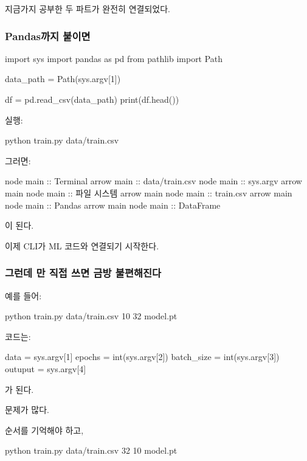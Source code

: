 지금가지 공부한 두 파트가 완전히 연결되었다.

\subsubsection{Pandas까지 붙이면}

\begin{dhkcode}
import sys
import pandas as pd
from pathlib import Path

data_path = Path(sys.argv[1])

df = pd.read_csv(data_path)
print(df.head())
\end{dhkcode}

실행:

\begin{dhkzsh}
python train.py data/train.csv
\end{dhkzsh}

그러면:

\begin{dhkbranch}[in=8]
node main :: Terminal
arrow main :: data/train.csv
node main :: sys.argv
arrow main
node main :: 파일 시스템
arrow main
node main :: train.csv
arrow main
node main :: Pandas
arrow main
node main :: DataFrame
\end{dhkbranch}

이 된다.

이제 CLI가 ML 코드와 연결되기 시작한다.

\subsubsection{그런데 만 직접 쓰면 금방 불편해진다}

예를 들어:

\begin{dhkzsh}
python train.py data/train.csv 10 32 model.pt
\end{dhkzsh}

코드는:

\begin{dhkcode}
data = sys.argv[1]
epochs = int(sys.argv[2])
batch_size = int(sys.argv[3])
outuput = sys.argv[4]
\end{dhkcode}

가 된다.

문제가 많다.

순서를 기억해야 하고,

\begin{dhkzsh}
python train.py data/train.csv 32 10 model.pt
\end{dhkzsh}


